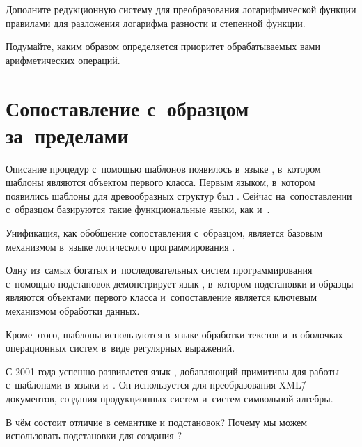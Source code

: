 \begin{Assignment}
Дополните редукционную систему для преобразования логарифмической функции правилами для разложения логарифма разности и степенной функции.

Подумайте, каким образом определяется приоритет обрабатываемых вами арифметических операций.
\end{Assignment}\newpage

\section[4]{Сопоставление с~образцом за~пределами~\Scheme}%
Описание процедур с~помощью шаблонов появилось в~языке , в~котором шаблоны являются объектом первого класса. Первым языком, в~котором появились шаблоны для древообразных структур был \Lisp. Сейчас на~сопоставлении с~образцом базируются такие функциональные языки, как  и~.

Унификация, как обобщение сопоставления с~образцом, является базовым механизмом в~языке логического программирования .

Одну из~самых богатых и~последовательных систем программирования с~помощью подстановок демонстрирует язык , в~котором подстановки и образцы являются объектами первого класса и~сопоставление является ключевым механизмом обработки данных.

Кроме этого, шаблоны используются в~языке обработки текстов  и~в оболочках операционных систем в~виде регулярных выражений.

С 2001 года успешно развивается язык , добавляющий примитивы для работы с~шаблонами в~языки  и~. Он используется для преобразования XML\=/документов, создания продукционных систем и~систем символьной алгебры.

\begin{Queeze}
 \item В чём состоит отличие в семантике  и подстановок? Почему мы можем использовать подстановки для создания ?
\end{Queeze}
